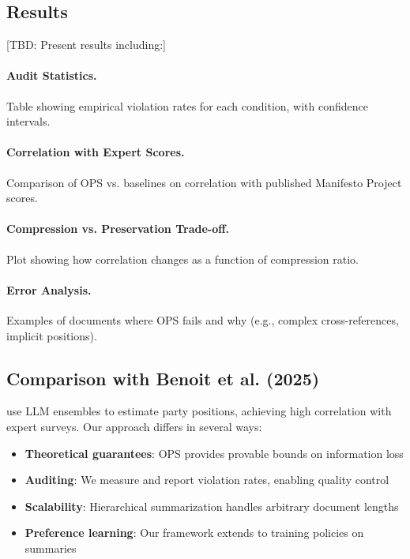 \subsection{Results}

[TBD: Present results including:]

\paragraph{Audit Statistics.}
Table showing empirical violation rates for each condition, with confidence intervals.

\paragraph{Correlation with Expert Scores.}
Comparison of OPS vs. baselines on correlation with published Manifesto Project scores.

\paragraph{Compression vs. Preservation Trade-off.}
Plot showing how correlation changes as a function of compression ratio.

\paragraph{Error Analysis.}
Examples of documents where OPS fails and why (e.g., complex cross-references, implicit positions).

\subsection{Comparison with Benoit et al. (2025)}

\citet{BenoitEtAl2025} use LLM ensembles to estimate party positions, achieving high correlation with expert surveys. Our approach differs in several ways:

\begin{itemize}[nosep]
    \item \textbf{Theoretical guarantees}: OPS provides provable bounds on information loss
    \item \textbf{Auditing}: We measure and report violation rates, enabling quality control
    \item \textbf{Scalability}: Hierarchical summarization handles arbitrary document lengths
    \item \textbf{Preference learning}: Our framework extends to training policies on summaries
\end{itemize}

